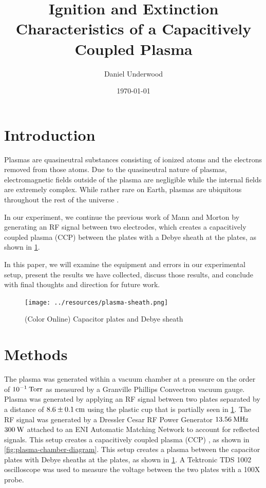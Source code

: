 \documentclass[reprint]{revtex4-1}
\begin{document}
\title{Ignition and Extinction Characteristics of a Capacitively Coupled Plasma}
\author{Daniel Underwood}
\date{\today}

\begin{abstract}

\end{abstract}
\maketitle

\section{Introduction}
Plasmas are quasineutral substances consisting of ionized atoms and the electrons removed from those atoms. Due to the quasineutral nature of plasmas, electromagnetic fields outside of the plasma are negligible while the internal fields are extremely complex. While rather rare on Earth, plasmas are ubiquitous throughout the rest of the universe \cite{F.F.Chen1989}.

In our experiment, we continue the previous work of Mann and Morton \cite{Mann2015} by generating an RF signal between two electrodes, which creates a capacitively coupled plasma (CCP) between the plates with a Debye sheath at the plates, as shown in \cref{fig:plasma-sheath}.

In this paper, we will examine the equipment and errors in our experimental setup, present the results we have collected, discuss those results, and conclude with final thoughts and direction for future work.

\begin{figure}[h]
\texttt{[image: ../resources/plasma-sheath.png]}
\caption{(Color Online) Capacitor plates and Debye sheath}
\label{fig:plasma-sheath}
\end{figure}

\section{Methods}

The plasma was generated within a vacuum chamber at a pressure on the order of $10^{-1}\:\rm{Torr}$ as measured by a Granville Phillips Convectron vacuum gauge. Plasma was generated by applying an RF signal between two plates separated by a distance of $8.6 \pm 0.1\:\rm{cm}$ using the plastic cup that is partially seen in \cref{fig:plasma-sheath}. The RF signal was generated by a Dressler Cesar RF Power Generator $13.56\:\rm{MHz}$ $300\:\rm{W}$ attached to an ENI Automatic Matching Network to account for reflected signals. This setup creates a capacitively coupled plasma (CCP) \cite{physics-radio-frequency}, as shown in \cref{fig:plasma-chamber-diagram}. This setup creates a plasma between the capacitor plates with Debye sheaths at the plates, as shown in \cref{fig:plasma-sheath}.  A Tektronic TDS 1002 oscilloscope was used to measure the voltage between the two plates with a 100X probe.
\end{document}

